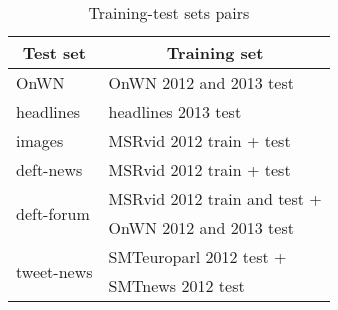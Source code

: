 \begin{table}[t!]
\begin{centering}
\begin{tabular}{|l|l|}
\hline 
\multicolumn{1}{|c|}{\bf\scriptsize Test set} & \multicolumn{1}{c|}{\bf\scriptsize Training set}\tabularnewline
\hline 
{\scriptsize OnWN} & {\scriptsize OnWN 2012 and 2013 test}\tabularnewline
\hline 
{\scriptsize headlines} & {\scriptsize headlines 2013 test}\tabularnewline
\hline 
{\scriptsize images} & {\scriptsize MSRvid 2012 train + test}\tabularnewline
\hline 
{\scriptsize deft-news} & {\scriptsize MSRvid 2012 train + test}\tabularnewline
\hline 
\multirow{2}{*}{{\scriptsize deft-forum}} & {\scriptsize MSRvid 2012 train and test +}\tabularnewline
 & {\scriptsize OnWN 2012 and 2013 test}\tabularnewline
\hline 
\multirow{2}{*}{{\scriptsize tweet-news}} & {\scriptsize SMTeuroparl 2012 test +}\tabularnewline
 & {\scriptsize SMTnews 2012 test }\tabularnewline
\hline 
\end{tabular}
\par\end{centering}

\centering{}\caption{Training-test sets pairs\label{tab:training-test-sets}}
\end{table}



